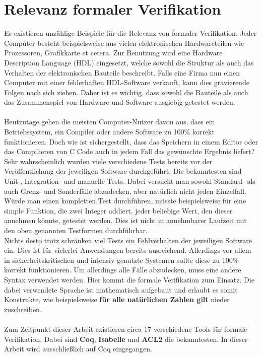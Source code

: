 \section{Relevanz formaler Verifikation}
Es existieren unzählige Beispiele für die Relevanz von formaler Verifikation. Jeder Computer besteht beispielsweise aus vielen elektronischen Hardwareteilen wie Prozessoren, Grafikkarte et cetera. Zur Benutzung wird eine Hardware Description Language (HDL) eingesetzt, welche sowohl die Struktur als auch das Verhalten der elektronischen Bauteile beschreibt. Falls eine Firma nun einen Computer mit einer fehlerhaften HDL-Software verkauft, kann dies gravierende Folgen nach sich ziehen.
Daher ist es wichtig, dass sowohl die Bauteile als auch das Zusammenspiel von Hardware und Software ausgiebig getestet werden.\\
\\
Heutzutage gehen die meisten Computer-Nutzer davon aus, dass ein Betriebssystem, ein Compiler oder andere Software zu 100\% korrekt funktionieren. Doch wie ist sichergestellt, dass das Speichern in einem Editor oder das Compilieren von C Code auch in jedem Fall das gewünschte Ergebnis liefert? \\
Sehr wahrscheinlich wurden viele verschiedene Tests bereits vor der Veröffentlichung der jeweiligen Software durchgeführt. Die bekanntesten sind Unit-, Integration- und manuelle Tests. Dabei versucht man sowohl Standard- als auch Grenz- und Sonderfälle abzudecken, aber natürlich nicht jeden Einzelfall. Würde man einen kompletten Test durchführen, müsste beispielsweise für eine simple Funktion, die zwei Integer addiert, jeder beliebige Wert, den dieser annehmen könnte, getestet werden. Dies ist nicht in annehmbarer Laufzeit mit den oben genannten Testformen durchführbar.\\
Nichts desto trotz schränken viel Tests ein Fehlverhalten der jeweiligen Software ein. Dies ist für vielerlei Anwendungen bereits ausreichend. Allerdings vor allem in sicherheitskritischen und intensiv genutzte Systemen sollte diese zu 100\% korrekt funktionieren.
Um allerdings alle Fälle abzudecken, muss eine andere Syntax verwendet werden. Hier kommt die formale Verifikation zum Einsatz. 
Die dabei verwendete Sprache ist mathematisch aufgebaut und erlaubt es somit Konstrukte, wie beispielsweise \textbf{für alle natürlichen Zahlen gilt} nieder zuschreiben.\\
\\
Zum Zeitpunkt dieser Arbeit existieren circa 17 verschiedene Tools für formale Verifikation. Dabei sind \textbf{Coq}, \textbf{Isabelle} und \textbf{ACL2} die bekanntesten.\cite{WIEDIJK01:FP}
In dieser Arbeit wird ausschließlich auf Coq eingegangen.

